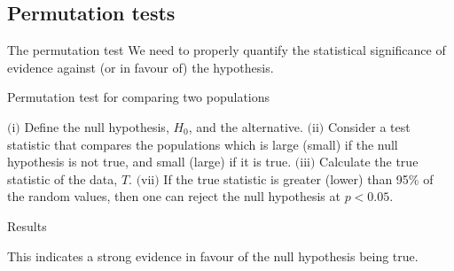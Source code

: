 \subsection{Permutation tests}
\begin{frame}[label=intro-hypothesis]{The permutation test}
	We need to properly quantify the statistical significance of evidence against (or in favour of) the hypothesis.

	\medskip
	\footnotesize
	\IncMargin{1em}
	\begin{algorithm}[H]
		\caption{Permutation test for comparing two populations}
		\label{alg:perm-test-theory}
		\DontPrintSemicolon
		$\text{(i)}$ Define the null hypothesis, $H_{0}$, and the alternative.\;
		$\text{(ii)}$ Consider a test statistic that compares the populations which is large (small) if the null hypothesis is not true, and small (large) if it is true.\;
		$\text{(iii)}$ Calculate the true statistic of the data, $T$.\;
		$\text{(vii)}$ If the true statistic is greater (lower) than 95\% of the random values, then one can reject the null hypothesis at $p<0.05$.\;
	\end{algorithm}
	\DecMargin{1em}

\end{frame}

\begin{frame}{Results}
	\begin{table}[H]
		\centering
		\caption{List of $p$-values of the bootstrap-powered permutation test for the North Atlantic basin data}
		\label{tab:perm-natl-boot-p-vals}
	\end{table}
	This indicates a strong evidence in favour of the null hypothesis being true.
\end{frame}


